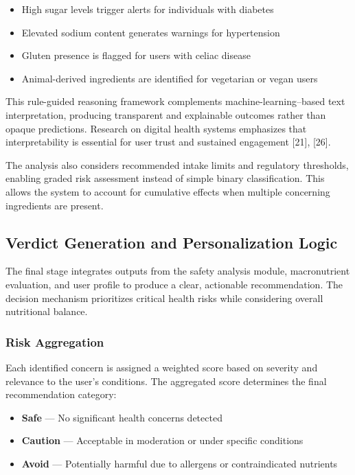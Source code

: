\documentclass[conference]{IEEEtran}
\begin{document}
\begin{itemize}
    \item High sugar levels trigger alerts for individuals with diabetes
    \item Elevated sodium content generates warnings for hypertension
    \item Gluten presence is flagged for users with celiac disease
    \item Animal-derived ingredients are identified for vegetarian or vegan users
\end{itemize}

This rule-guided reasoning framework complements machine-learning--based text interpretation, producing transparent and explainable outcomes rather than opaque predictions. Research on digital health systems emphasizes that interpretability is essential for user trust and sustained engagement [21], [26].

The analysis also considers recommended intake limits and regulatory thresholds, enabling graded risk assessment instead of simple binary classification. This allows the system to account for cumulative effects when multiple concerning ingredients are present.

\subsection{Verdict Generation and Personalization Logic}

The final stage integrates outputs from the safety analysis module, macronutrient evaluation, and user profile to produce a clear, actionable recommendation. The decision mechanism prioritizes critical health risks while considering overall nutritional balance.

\subsubsection{Risk Aggregation}

Each identified concern is assigned a weighted score based on severity and relevance to the user’s conditions. The aggregated score determines the final recommendation category:

\begin{itemize}
    \item \textbf{Safe} --- No significant health concerns detected
    \item \textbf{Caution} --- Acceptable in moderation or under specific conditions
    \item \textbf{Avoid} --- Potentially harmful due to allergens or contraindicated nutrients
\end{itemize}
\end{document}
